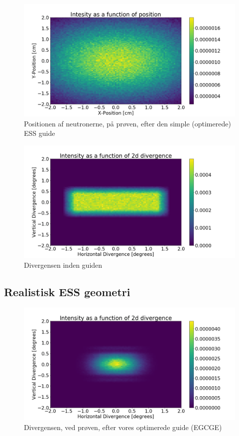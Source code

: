 \documentclass[12pt,oneside,a4paper]{article}
\begin{document}
{{{{{\begin{figure}[H]
\centering
\includegraphics[width=1\textwidth]{psd_ess_simple_after.png}
\caption{Positionen af neutronerne, på prøven, efter den simple (optimerede) ESS guide}
\end{figure}


\begin{figure}[H]
\centering
\includegraphics[width=1\textwidth]{div_straight_before.png}
\caption{Divergensen inden guiden}
\end{figure}

\newpage
\subsection{Realistisk ESS geometri}

\begin{figure}[H]
\centering
\includegraphics[width=1\textwidth]{div_after_ess_brill_optimized.png}
\caption{Divergensen, ved prøven, efter vores optimerede guide (EGCGE)}
\end{figure}

}}}}}
\end{document}
